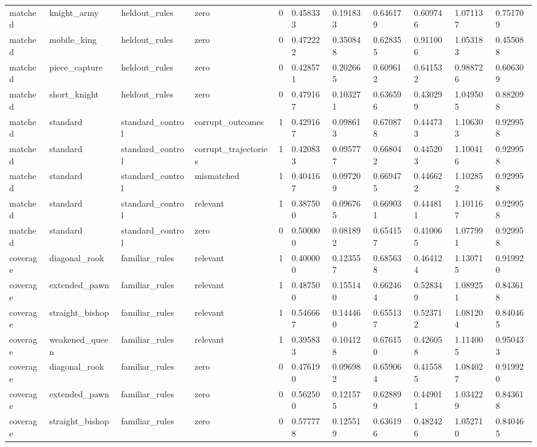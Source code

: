 \begin{tabular}{lllllllllll}
matched & knight\_army & heldout\_rules & zero & 0 & 0.458333 & 0.191833 & 0.646179 & 0.609746 & 1.071137 & 0.751709 \\
matched & mobile\_king & heldout\_rules & zero & 0 & 0.472222 & 0.350848 & 0.628355 & 0.911006 & 1.053183 & 0.455088 \\
matched & piece\_capture & heldout\_rules & zero & 0 & 0.428571 & 0.202665 & 0.609612 & 0.641532 & 0.988726 & 0.606309 \\
matched & short\_knight & heldout\_rules & zero & 0 & 0.479167 & 0.103271 & 0.636596 & 0.430299 & 1.049505 & 0.882098 \\
matched & standard & standard\_control & corrupt\_outcomes & 1 & 0.429167 & 0.098613 & 0.670878 & 0.444733 & 1.106303 & 0.929958 \\
matched & standard & standard\_control & corrupt\_trajectories & 1 & 0.420833 & 0.095777 & 0.668042 & 0.445203 & 1.100416 & 0.929958 \\
matched & standard & standard\_control & mismatched & 1 & 0.404167 & 0.097209 & 0.669475 & 0.446622 & 1.102852 & 0.929958 \\
matched & standard & standard\_control & relevant & 1 & 0.387500 & 0.096765 & 0.669031 & 0.444811 & 1.101167 & 0.929958 \\
matched & standard & standard\_control & zero & 0 & 0.500000 & 0.081892 & 0.654157 & 0.410065 & 1.077991 & 0.929958 \\
coverage & diagonal\_rook & familiar\_rules & relevant & 1 & 0.400000 & 0.123557 & 0.685638 & 0.464124 & 1.130715 & 0.919920 \\
coverage & extended\_pawn & familiar\_rules & relevant & 1 & 0.487500 & 0.155140 & 0.662464 & 0.528349 & 1.089251 & 0.843618 \\
coverage & straight\_bishop & familiar\_rules & relevant & 1 & 0.546667 & 0.144460 & 0.655137 & 0.523712 & 1.081204 & 0.840465 \\
coverage & weakened\_queen & familiar\_rules & relevant & 1 & 0.395833 & 0.104128 & 0.676150 & 0.426058 & 1.114005 & 0.950433 \\
coverage & diagonal\_rook & familiar\_rules & zero & 0 & 0.476190 & 0.096982 & 0.659064 & 0.415585 & 1.084027 & 0.919920 \\
coverage & extended\_pawn & familiar\_rules & zero & 0 & 0.562500 & 0.121575 & 0.628899 & 0.449011 & 1.034229 & 0.843618 \\
coverage & straight\_bishop & familiar\_rules & zero & 0 & 0.577778 & 0.125519 & 0.636196 & 0.482426 & 1.052710 & 0.840465 \\

\end{tabular}
